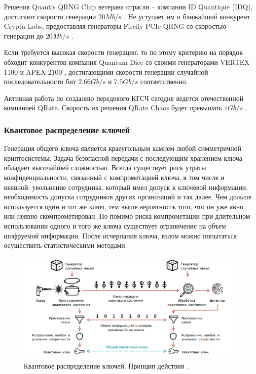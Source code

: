 \documentclass[a4paper,12pt]{article}
\begin{document}
Решения Quantis QRNG Chip ветерана отрасли -- компании ID Quantique (IDQ), достигают скорости генерации $20 Mb/s$ \cite{Quantis_QRNG}. Не уступает им и ближайший конкурент Crypta Labs, предоставляя генераторы Firefly PCIe QRNG со скоростью генерации до $20 Mb/s$ \cite{CryptaLabs_Firefly}.

Если требуется высокая скорости генерации, то по этому критерию на порядок обходит конкурентов компания Quantum Dice со своими генераторами VERTEX 1100 \cite{QuantumDice_VERTEX} и APEX 2100 \cite{QuantumDice_APEX}, достигающими скорости генерации случайной последовательности бит $2.66 Gb/s$ и $7.5 Gb/s$ соответственно.

Активная работа по созданию передового КГСЧ сегодня ведется отечественной компанией QRate. Скорость их решения QRate Chaos будет превышать $1 Gb/s$ \cite{QRateChaos}.  


\subsubsection{Квантовое распределение ключей}

Генерация общего ключа является краеугольным камнем любой симметричной криптосистемы. Задача безопасной передачи с последующим хранением ключа обладает высочайшей сложностью. Всегда существует риск утраты конфиденциальности, связанный с компрометацией ключа, в том числе и неявной: увольнение сотрудника, который имел допуск к ключевой информации, необходимость допуска сотрудников других организаций и так далее. Чем дольше используется один и тот же ключ, тем выше вероятность того, что он уже явно или неявно скомпрометирован. Но помимо риска компрометации при длительном использовании одного и того же ключа существует ограничение на объем шифруемой информации. После исчерпания ключа, взлом можно попытаться осуществить статистическими методами.

\begin{figure}[h]
	\centering
	\includegraphics[width=0.7\linewidth]{images/infotecs_distrib}
	\caption{Квантовое распределение ключей. Принцип действия \cite{Infotecs_Sheet}.}
	\label{fig:infotecskeys}
\end{figure}
\end{document}
